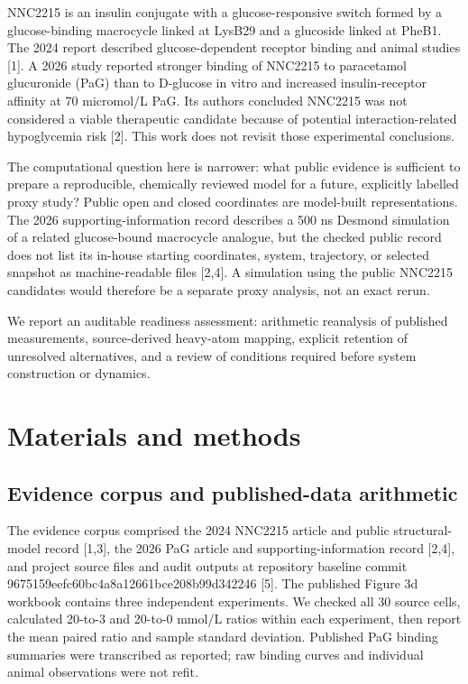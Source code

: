 \documentclass[11pt]{article}
\begin{document}
NNC2215 is an insulin conjugate with a glucose-responsive switch formed by a glucose-binding macrocycle linked at LysB29 and a glucoside linked at PheB1. The 2024 report described glucose-dependent receptor binding and animal studies [1]. A 2026 study reported stronger binding of NNC2215 to paracetamol glucuronide (PaG) than to D-glucose in vitro and increased insulin-receptor affinity at 70 micromol/L PaG. Its authors concluded NNC2215 was not considered a viable therapeutic candidate because of potential interaction-related hypoglycemia risk [2]. This work does not revisit those experimental conclusions.

The computational question here is narrower: what public evidence is sufficient to prepare a reproducible, chemically reviewed model for a future, explicitly labelled proxy study? Public open and closed coordinates are model-built representations. The 2026 supporting-information record describes a 500 ns Desmond simulation of a related glucose-bound macrocycle analogue, but the checked public record does not list its in-house starting coordinates, system, trajectory, or selected snapshot as machine-readable files [2,4]. A simulation using the public NNC2215 candidates would therefore be a separate proxy analysis, not an exact rerun.

We report an auditable readiness assessment: arithmetic reanalysis of published measurements, source-derived heavy-atom mapping, explicit retention of unresolved alternatives, and a review of conditions required before system construction or dynamics.

\section{Materials and methods}

\subsection{Evidence corpus and published-data arithmetic}

The evidence corpus comprised the 2024 NNC2215 article and public structural-model record [1,3], the 2026 PaG article and supporting-information record [2,4], and project source files and audit outputs at repository baseline commit 9675159eefc60bc4a8a12661bce208b99d342246 [5]. The published Figure 3d workbook contains three independent experiments. We checked all 30 source cells, calculated 20-to-3 and 20-to-0 mmol/L ratios within each experiment, then report the mean paired ratio and sample standard deviation. Published PaG binding summaries were transcribed as reported; raw binding curves and individual animal observations were not refit.
\end{document}
